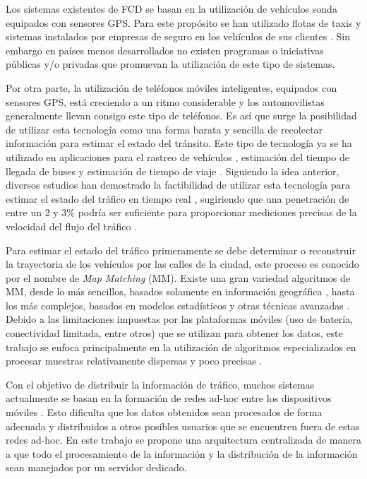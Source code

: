 Los sistemas existentes de FCD se basan en la utilización de vehículos sonda equipados con sensores GPS. Para este propósito se han utilizado flotas de taxis \citep{schafer2002traffic,reinthaler2007evaluation} y sistemas instalados por empresas de seguro en los vehículos de sus clientes \citep{giovannini2011novel}. Sin embargo en países menos desarrollados no existen programas o iniciativas públicas y/o privadas que promuevan la utilización de este tipo de sistemas.

Por otra parte, la utilización de teléfonos móviles inteligentes, equipados con sensores GPS, está creciendo a un ritmo considerable y los automovilistas generalmente llevan consigo este tipo de teléfonos. Es así que surge la posibilidad de utilizar esta tecnología como una forma barata y sencilla de recolectar información para estimar el estado del tránsito. Este tipo de tecnología ya se ha utilizado en aplicaciones para el rastreo de vehículos \citep{thiagarajan2010cooperative}, estimación del tiempo de llegada de buses \citep{zhou2012long} y estimación de tiempo de viaje \citep{thiagarajan2009vtrack}. Siguiendo la idea anterior, diversos estudios han demostrado la factibilidad de utilizar esta tecnología para estimar el estado del tráfico en tiempo real \citep{tao2012real,herrera2010evaluation}, sugiriendo que una penetración de entre un 2 y 3\% podría ser suficiente para proporcionar mediciones precisas de la velocidad del flujo del tráfico \citep{herrera2010evaluation}.

Para estimar el estado del tráfico primeramente se debe determinar o reconstruir la trayectoria de los vehículos por las calles de la ciudad, este proceso es conocido por el nombre de \emph{Map Matching} (MM). Existe una gran variedad algoritmos de MM, desde lo más sencillos, basados solamente en información geográfica \citep{white2000some}, hasta los más complejos, basados en modelos estadísticos y otras técnicas avanzadas \citep{quddus2006high,kim2001adaptive}. Debido a las limitaciones impuestas por las plataformas móviles (uso de batería, conectividad limitada, entre otros) que se utilizan para obtener los datos, este trabajo se enfoca principalmente en la utilización de algoritmos especializados en procesar muestras relativamente dispersas y poco precisas \citep{lou2009map}.

Con el objetivo de distribuir la información de tráfico, muchos sistemas actualmente se basan en la formación de redes ad-hoc entre los dispositivos móviles \citep{zhong2008disseminating,leontiadis2011effectiveness}. Esto dificulta que los datos obtenidos sean procesados de forma adecuada y distribuidos a otros posibles usuarios que se encuentren fuera de estas redes ad-hoc. En este trabajo se propone una arquitectura centralizada de manera a que todo el procesamiento de la información y la distribución de la información sean manejados por un servidor dedicado.

